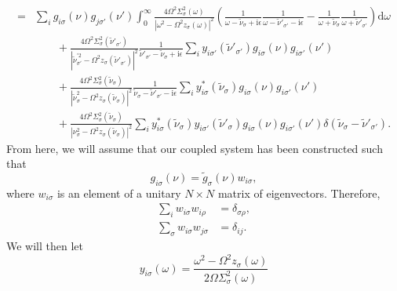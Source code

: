 \begin{equation}
\begin{split}
= &\sum_ig_{i\sigma}(\nu)g_{j\sigma'}(\nu')\int_0^\infty\frac{4\Omega^2\Sigma_\sigma^2(\omega)}{|\omega^2 - \Omega^2z_\sigma(\omega)|^2}\left(\frac{1}{\omega - \tilde{\nu}_\sigma + \mathrm{i}\epsilon}\frac{1}{\omega - \tilde{\nu}'_{\sigma'} - \mathrm{i}\epsilon} - \frac{1}{\omega + \tilde{\nu}_\sigma}\frac{1}{\omega + \tilde{\nu}'_{\sigma'}}\right)\mathrm{d}\omega\\
&\qquad + \frac{4\Omega^2\Sigma_\sigma^2(\tilde{\nu}'_{\sigma'})}{|\tilde{\nu}_{\sigma'}^{\prime2} - \Omega^2z_\sigma(\tilde{\nu}'_{\sigma'})|^2}\frac{1}{\tilde{\nu}'_{\sigma'} - \tilde{\nu}_\sigma + \mathrm{i}\epsilon}\sum_{i}y_{i\sigma'}(\tilde{\nu}'_{\sigma'})g_{i\sigma}(\nu)g_{i\sigma'}(\nu')\\
&\qquad + \frac{4\Omega^2\Sigma_\sigma^2(\tilde{\nu}_\sigma)}{|\tilde{\nu}_\sigma^2 - \Omega^2z_\sigma(\tilde{\nu}_\sigma)|^2}\frac{1}{\tilde{\nu}_\sigma - \tilde{\nu}'_{\sigma'} - \mathrm{i}\epsilon}\sum_{i}y_{i\sigma}^*(\tilde{\nu}_\sigma)g_{i\sigma}(\nu)g_{i\sigma'}(\nu')\\
&\qquad + \frac{4\Omega^2\Sigma_\sigma^2(\tilde{\nu}_\sigma)}{|\nu_\sigma^2 - \Omega^2z_\sigma(\tilde{\nu}_\sigma)|^2}\sum_{i}y^*_{i\sigma}(\tilde{\nu}_\sigma)y_{i\sigma'}(\tilde{\nu}'_\sigma)g_{i\sigma}(\nu)g_{i\sigma'}(\nu')\delta(\tilde{\nu}_\sigma - \tilde{\nu}'_{\sigma'}).
\end{split}
\end{equation}
From here, we will assume that our coupled system has been constructed such that
\begin{equation}
g_{i\sigma}(\nu) = \tilde{g}_\sigma(\nu)w_{i\sigma},
\end{equation}
where $w_{i\sigma}$ is an element of a unitary $N\times N$ matrix of eigenvectors. Therefore,
\begin{equation}
\begin{split}
\sum_iw_{i\sigma}w_{i\rho} &= \delta_{\sigma\rho},\\
\sum_\sigma w_{i\sigma}w_{j\sigma} &= \delta_{ij}.
\end{split}
\end{equation}
We will then let
\begin{equation}
y_{i\sigma}(\omega) = \frac{\omega^2 - \Omega^2z_\sigma(\omega)}{2\Omega\Sigma_\sigma^2(\omega)}
\end{equation}
